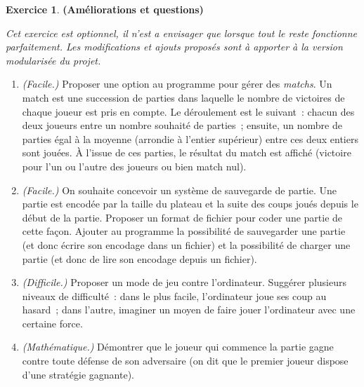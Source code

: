 \documentclass[12pt]{article}
\theoremstyle{definition}
\newtheorem{Exercice}{Exercice}
\begin{document}
\begin{Exercice} {\bf (Améliorations et questions)}\smallskip

{\it Cet exercice est optionnel, il n'est a envisager que lorsque
tout le reste fonctionne parfaitement. Les modifications et ajouts
proposés sont à apporter à la version modularisée du projet.}
\smallskip

\begin{enumerate}
    \item {\it (Facile.)} Proposer une option au programme pour gérer 
    des {\em matchs}. Un match est une succession de parties dans 
    laquelle le nombre de victoires de chaque joueur est pris en compte. 
    Le déroulement est le suivant~: chacun des deux joueurs entre un 
    nombre souhaité de parties~; ensuite, un nombre de parties égal à la 
    moyenne (arrondie à l'entier supérieur) entre ces deux entiers sont 
    jouées. À l'issue de ces parties, le résultat du match est affiché
    (victoire pour l'un ou l'autre des joueurs ou bien match nul).
    \smallskip

    \item {\it (Facile.)} On souhaite concevoir un système de sauvegarde 
    de partie. Une partie est encodée par la taille du plateau et la suite 
    des coups joués depuis le début de la partie. Proposer un format de 
    fichier pour coder une partie de cette façon. Ajouter au programme 
    la possibilité de sauvegarder une partie (et donc écrire son encodage 
    dans un fichier) et la possibilité de charger une partie (et donc de 
    lire son encodage depuis un fichier).
    \smallskip

    \item {\it (Difficile.)} Proposer un mode de jeu contre l'ordinateur. 
    Suggérer plusieurs niveaux de difficulté~: dans le plus facile, 
    l'ordinateur joue ses coup au hasard~; dans l'autre, imaginer un moyen 
    de faire jouer l'ordinateur avec une certaine force.
    \smallskip
    
    \item {\it (Mathématique.)} Démontrer que le joueur qui commence la
    partie gagne contre toute défense de son adversaire (on dit que 
    le premier joueur dispose d'une \og stratégie gagnante\fg).
\end{enumerate}
\end{Exercice}
\bigskip
\end{document}
